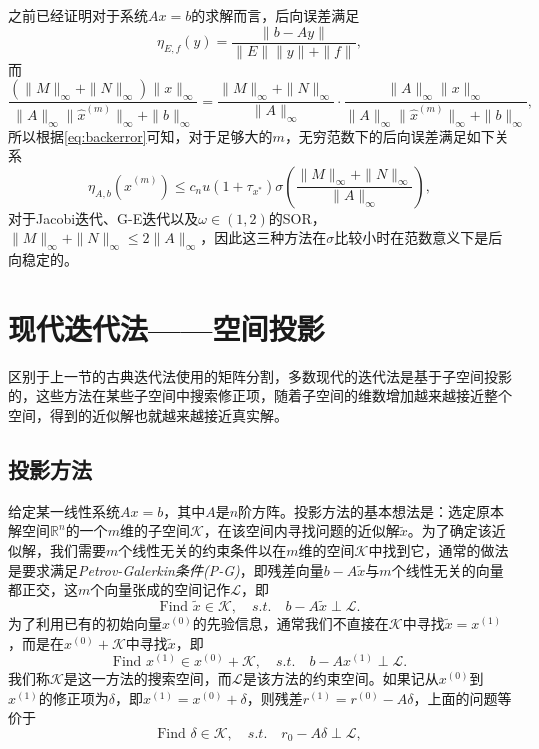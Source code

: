 \documentclass[a4paper,10pt]{ctexart}
\begin{document}
之前已经证明对于系统$ Ax=b $的求解而言，后向误差满足
\begin{equation}
    \eta_{E,f}(y) = \frac{\| b - Ay \|}{\| E \| \| y \| + \| f \|},
\end{equation}
而
\[
    \frac{(\| M \|_\infty + \| N \|_\infty) \| x \|_\infty}{\| A \|_\infty \| \hat{x}^{(m)} \|_\infty + \| b \|_\infty} =  \frac{\| M \|_\infty + \| N \|_\infty}{\| A \|_\infty} \cdot \frac{\| A \|_\infty \| x \|_\infty}{\| A \|_\infty \| \hat{x}^{(m)} \|_\infty + \| b \|_\infty},
\]
所以根据\eqref{eq:backerror}可知，对于足够大的$ m $，无穷范数下的后向误差满足如下关系
\begin{equation}
    \eta_{A,b}(\hat{x}^{(m)}) \leqslant c_n u(1+\tau_{x^*})\sigma\left( \frac{\| M \|_\infty + \| N \|_\infty}{\| A \|_\infty} \right) ,
\end{equation}
对于Jacobi迭代、G-E迭代以及$ \omega\in(1,2) $的SOR，$ \| M \|_\infty + \| N \|_\infty \leqslant 2\| A \|_\infty $，因此这三种方法在$ \sigma $比较小时在范数意义下是后向稳定的。

\section{现代迭代法——空间投影}
区别于上一节的古典迭代法使用的矩阵分割，多数现代的迭代法是基于子空间投影的，这些方法在某些子空间中搜索修正项，随着子空间的维数增加越来越接近整个空间，得到的近似解也就越来越接近真实解。

\subsection{投影方法}
给定某一线性系统$ Ax=b $，其中$ A $是$ n $阶方阵。投影方法的基本想法是：选定原本解空间$ \mathbb{R}^n $的一个$ m $维的子空间$ \mathcal{K} $，在该空间内寻找问题的近似解$ \tilde{x} $。为了确定该近似解，我们需要$ m $个线性无关的约束条件以在$ m $维的空间$ \mathcal{K} $中找到它，通常的做法是要求满足\emph{Petrov-Galerkin条件(P-G)}，即残差向量$ b-A \tilde{x} $与$ m $个线性无关的向量都正交，这$ m $个向量张成的空间记作$ \mathcal{L} $，即
\[
    \text{Find } \tilde{x}\in \mathcal{K},\quad s.t.\quad b - A\tilde{x}\perp \mathcal{L}.
\]
为了利用已有的初始向量$ x^{(0)} $的先验信息，通常我们不直接在$ \mathcal{K} $中寻找$ \tilde{x} = x^{(1)} $，而是在$ x^{(0)} + \mathcal{K} $中寻找$ \tilde{x} $，即
\begin{equation}
    \text{Find } x^{(1)}\in x^{(0)} + \mathcal{K},\quad s.t.\quad b - Ax^{(1)}\perp \mathcal{L}.
\end{equation}
我们称$ \mathcal{K} $是这一方法的搜索空间，而$ \mathcal{L} $是该方法的约束空间。如果记从$ x^{(0)} $到$ x^{(1)} $的修正项为$ \delta $，即$ x^{(1)} = x^{(0)} + \delta $，则残差$ r^{(1)} = r^{(0)} - A\delta $，上面的问题等价于
\[
    \text{Find } \delta\in \mathcal{K},\quad s.t.\quad r_0 - A \delta\perp \mathcal{L},
\]
\end{document}
